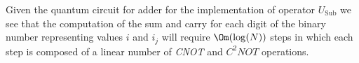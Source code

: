 %

Given the quantum circuit for adder for the implementation of operator $U_{\mathrm{Sub}}$ we see that the computation of the sum and carry for each digit of the binary number representing values $i$ and $i_j$ will require $\Om(\log(N))$ steps in which each step is composed of a linear number of \textit{CNOT} and $C^{2}NOT$ operations.

